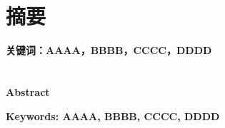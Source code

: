 


{\centering\chapter*{摘\hspace{1em}要}}

\vfill

{
  \heiti{}\bfseries 关键词：AAAA，BBBB，CCCC，DDDD
}

\vspace{1cm}

\cleardoublepage


{\centering\chapter*{\etitlefirst\etitlesecond}}

{\centering\heiti{}\selectfont\bfseries Abstract\par}

\vfill

{
  \heiti{}\bfseries Keywords: AAAA, BBBB, CCCC, DDDD
}

\vspace{1cm}
